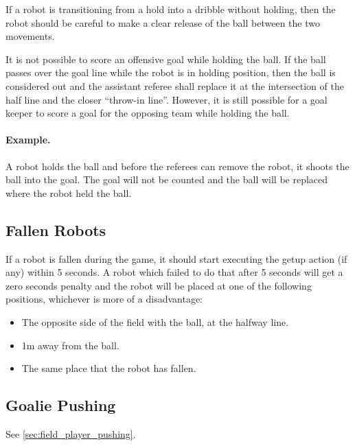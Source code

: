 \documentclass[12pt]{article}
\begin{document}
If a robot is transitioning from a hold into a dribble without holding,
then the robot should be careful to make a clear release of the ball
between the two movements.

It is not possible to score an offensive goal while holding the ball.  If the ball passes over the goal line while the robot is in holding position, then the ball is considered out
and the assistant referee shall replace it at the intersection of the
half line and the closer ``throw-in line''. However, it is still possible for a goal keeper to score a goal for the opposing team
while holding the ball. 

\paragraph{Example.} A robot holds the ball and before the referees
can remove the robot, it shoots the ball into the goal.  The goal
will not be counted and the ball will be replaced where the robot
held the ball.

\subsection{Fallen Robots}
\label{sec:fallenrobots}

If a robot is fallen during the game, it should start executing the getup action (if any) within 5 seconds. A robot which failed to do that after 5 seconds will get a zero seconds penalty and the 
robot will be placed at one of the following positions, whichever is 
more of a disadvantage:
\begin{itemize}
 \item The opposite side of the field with the ball, at the halfway line.
 \item 1m away from the ball.
 \item The same place that the robot has fallen.
\end{itemize}

\subsection{Goalie Pushing}
\label{sec:goalie_pushing}

See \ref{sec:field_player_pushing}.
\end{document}
